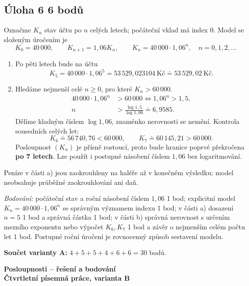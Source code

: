 \documentclass[a4paper,11pt]{article}
\begin{document}
\subsection*{Úloha 6 \hfill 6 bodů}
Označme $K_n$ stav účtu po $n$ celých letech; počáteční vklad má index $0$.
Model se složeným úročením je
\[
    K_0=40\,000,\qquad K_{n+1}=1{,}06K_n,\qquad
    K_n=40\,000\cdot1{,}06^n,\quad n=0,1,2,\ldots
\]
\begin{enumerate}[label=\alph*)]
    \item Po pěti letech bude na účtu
    \[
        K_5=40\,000\cdot1{,}06^5
        =53\,529{,}023104\ \text{Kč}
        \doteq53\,529{,}02\ \text{Kč}.
    \]
    \item Hledáme nejmenší celé $n\ge0$, pro které $K_n>60\,000$.
    \begin{align*}
        40\,000\cdot1{,}06^n&>60\,000
        \iff 1{,}06^n>1{,}5,\\
        n&>\frac{\log1{,}5}{\log1{,}06}\doteq6{,}9585.
    \end{align*}
    Dělíme kladným číslem $\log1{,}06$, znaménko nerovnosti se nemění.
    Kontrola sousedních celých let:
    \[
        K_6\doteq56\,740{,}76<60\,000,
        \qquad K_7\doteq60\,145{,}21>60\,000.
    \]
    Posloupnost $(K_n)$ je přísně rostoucí, proto bude hranice poprvé
    překročena \textbf{po 7 letech}. Lze použít i postupné násobení
    číslem $1{,}06$ bez logaritmování.
\end{enumerate}
Peníze v části a) jsou zaokrouhleny na haléře až v konečném výsledku;
model neobsahuje průběžné zaokrouhlování ani daň.

\textit{Bodování:} počáteční stav a roční násobení číslem $1{,}06$
1 bod; explicitní model $K_n=40\,000\cdot1{,}06^n$ se správným významem
indexu 1 bod; v části a) dosazení $n=5$ 1 bod a správná částka 1 bod;
v části b) správná nerovnost s určením mezního exponentu nebo výpočet
$K_6,K_7$ 1 bod a závěr o nejmenším celém počtu let 1 bod.
Postupné roční úročení je rovnocenný způsob sestavení modelu.

\medskip
\textbf{Součet varianty A:} $4+5+5+4+6+6=30$ bodů.

\newpage
\begin{center}
    {\Large\bfseries Posloupnosti -- řešení a bodování}\\[2mm]
    {\bfseries Čtvrtletní písemná práce, varianta B}
\end{center}
\end{document}
